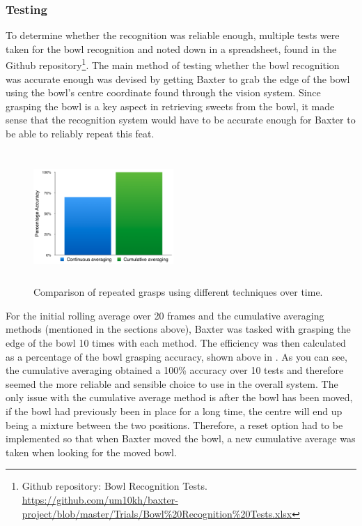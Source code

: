 \subsubsection{Testing}
To determine whether the recognition was reliable enough, multiple tests were taken for the bowl recognition and noted down in a spreadsheet, found in the Github repository\footnote{Github repository: Bowl Recognition Tests. \url{https://github.com/um10kh/baxter-project/blob/master/Trials/Bowl\%20Recognition\%20Tests.xlsx}}. The main method of testing whether the bowl recognition was accurate enough was devised by getting Baxter to grab the edge of the bowl using the bowl's centre coordinate found through the vision system. Since grasping the bowl is a key aspect in retrieving sweets from the bowl, it made sense that the recognition system would have to be accurate enough for Baxter to be able to reliably repeat this feat.
\captionsetup[figure]{justification=centering}
\begin{figure}[H]
        \centering 
        \includegraphics[width=0.475\textwidth, height=5cm]{bowlrecognition.png}
        \caption{Comparison of repeated grasps using different techniques over time.}
        \label{fig:bowlRecognition}
\end{figure}
\vspace{-0.2cm}For the initial rolling average over 20 frames and the cumulative averaging methods (mentioned in the sections above), Baxter was tasked with grasping the edge of the bowl 10 times with each method. The efficiency was then calculated as a percentage of the bowl grasping accuracy, shown above in \textbf{}. As you can see, the cumulative averaging obtained a 100\% accuracy over 10 tests and therefore seemed the more reliable and sensible choice to use in the overall system. The only issue with the cumulative average method is after the bowl has been moved, if the bowl had previously been in place for a long time, the centre will end up being a mixture between the two positions. Therefore, a reset option had to be implemented so that when Baxter moved the bowl, a new cumulative average was taken when looking for the moved bowl.
